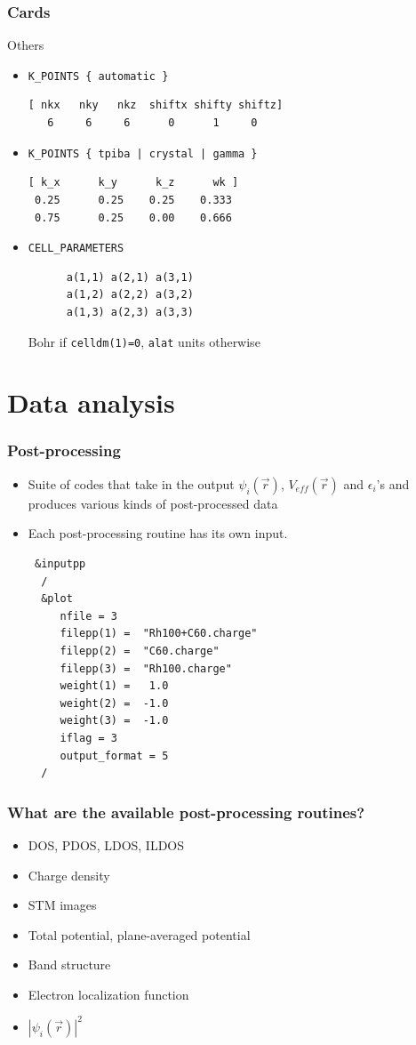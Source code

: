 \documentclass[]{beamer}
\def\t#1{{\texttt{#1}}}
\def\vr{\vec{r}}
\begin{document}
\begin{frame}[fragile] 
\frametitle{Cards}
\begin{block}{Others}
\begin{itemize}
\item<1-> \t{K\_POINTS \{ automatic \}} 
\begin{verbatim}
[ nkx   nky   nkz  shiftx shifty shiftz]
   6     6     6      0      1     0
\end{verbatim}
\item<1-> \t{K\_POINTS \{ tpiba | crystal | gamma \}} 
\begin{verbatim}
[ k_x      k_y      k_z      wk ]
 0.25      0.25    0.25    0.333
 0.75      0.25    0.00    0.666
\end{verbatim}
\item \t{CELL\_PARAMETERS}  

\begin{verbatim}
      a(1,1) a(2,1) a(3,1)
      a(1,2) a(2,2) a(3,2)
      a(1,3) a(2,3) a(3,3)
\end{verbatim}
Bohr if \t{celldm(1)=0}, \t{alat} units otherwise
\end{itemize}
\end{block}
\end{frame}

\section{Data analysis}
\begin{frame}[fragile]
\frametitle{Post-processing}
\begin{itemize}
\item Suite of codes that take in the output $\psi_i(\vr)$, $V_{eff}(\vr)$ and
  $\epsilon_i$'s and produces various kinds of post-processed data
\item Each post-processing routine has its own input.
\begin{verbatim}
 &inputpp
  /
  &plot
     nfile = 3
     filepp(1) =  "Rh100+C60.charge"
     filepp(2) =  "C60.charge"
     filepp(3) =  "Rh100.charge"
     weight(1) =   1.0
     weight(2) =  -1.0
     weight(3) =  -1.0
     iflag = 3
     output_format = 5
  /
\end{verbatim}
\end{itemize}
\end{frame}

\begin{frame}
\frametitle{What are the available post-processing routines?}
\begin{itemize}
\item DOS, PDOS, LDOS, ILDOS
\item Charge density 
\item STM images
\item Total potential, plane-averaged potential
\item Band structure
\item Electron localization function
\item $|\psi_i(\vr)|^2$
\end{itemize}
\end{frame}
\end{document}
